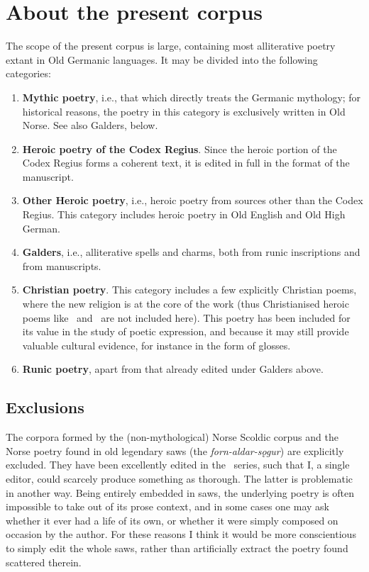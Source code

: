 \section{About the present corpus}
  The scope of the present corpus is large, containing most alliterative poetry extant in Old Germanic languages.  It may be divided into the following categories:
  \begin{enumerate}
    \item \textbf{Mythic poetry}, i.e., that which directly treats the Germanic mythology; for historical reasons, the poetry in this category is exclusively written in Old Norse.  See also Galders, below.
    \item \textbf{Heroic poetry of the Codex Regius}.  Since the heroic portion of the Codex Regius forms a coherent text, it is edited in full in the format of the manuscript.
    \item \textbf{Other Heroic poetry}, i.e., heroic poetry from sources other than the Codex Regius.  This category includes heroic poetry in Old English and Old High German.
    \item \textbf{Galders}, i.e., alliterative spells and charms, both from runic inscriptions and from manuscripts.
    \item \textbf{Christian poetry}.  This category includes a few explicitly Christian poems, where the new religion is at the core of the work (thus Christianised heroic poems like \Beowulf\ and \Hildebrandslied\ are not included here).  This poetry has been included for its value in the study of poetic expression, and because it may still provide valuable cultural evidence, for instance in the form of glosses.
    \item \textbf{Runic poetry}, apart from that already edited under Galders above.
  \end{enumerate}

  \subsection{Exclusions}
    The corpora formed by the (non-mythological) Norse Scoldic corpus and the Norse poetry found in old legendary saws (the \emph{forn-aldar-sǫgur}) are explicitly excluded.  They have been excellently edited in the \Skp\ series, such that I, a single editor, could scarcely produce something as thorough.  The latter is problematic in another way.  Being entirely embedded in saws, the underlying poetry is often impossible to take out of its prose context, and in some cases one may ask whether it ever had a life of its own, or whether it were simply composed on occasion by the author.  For these reasons I think it would be more conscientious to simply edit the whole saws, rather than artificially extract the poetry found scattered therein.


